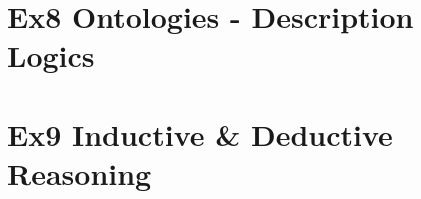 \documentclass[12pt]{article}
\begin{document}
{\section{Ex8 Ontologies - Description Logics}
\label{sec: ex8}

\section{Ex9 Inductive \& Deductive Reasoning}
\label{sec: ex9}


}
\end{document}
